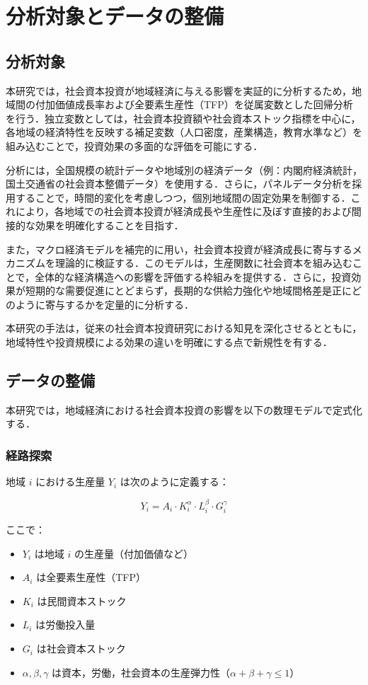 \chapter{分析対象とデータの整備}

\section{分析対象}
本研究では，社会資本投資が地域経済に与える影響を実証的に分析するため，地域間の付加価値成長率および全要素生産性（TFP）を従属変数とした回帰分析を行う．独立変数としては，社会資本投資額や社会資本ストック指標を中心に，各地域の経済特性を反映する補足変数（人口密度，産業構造，教育水準など）を組み込むことで，投資効果の多面的な評価を可能にする．

分析には，全国規模の統計データや地域別の経済データ（例：内閣府経済統計，国土交通省の社会資本整備データ）を使用する．さらに，パネルデータ分析を採用することで，時間的変化を考慮しつつ，個別地域間の固定効果を制御する．これにより，各地域での社会資本投資が経済成長や生産性に及ぼす直接的および間接的な効果を明確化することを目指す．

また，マクロ経済モデルを補完的に用い，社会資本投資が経済成長に寄与するメカニズムを理論的に検証する．このモデルは，生産関数に社会資本を組み込むことで，全体的な経済構造への影響を評価する枠組みを提供する．さらに，投資効果が短期的な需要促進にとどまらず，長期的な供給力強化や地域間格差是正にどのように寄与するかを定量的に分析する．

本研究の手法は，従来の社会資本投資研究における知見を深化させるとともに，地域特性や投資規模による効果の違いを明確にする点で新規性を有する．

\section{データの整備}

本研究では，地域経済における社会資本投資の影響を以下の数理モデルで定式化する．

\subsection{経路探索}

地域 \( i \) における生産量 \( Y_i \) は次のように定義する：

\[
	Y_i = A_i \cdot K_i^\alpha \cdot L_i^\beta \cdot G_i^\gamma
\]

ここで：
\begin{itemize}
	\renewcommand{\labelitemi}{}
	\item \( Y_i \) は地域 \( i \) の生産量（付加価値など）
	\item \( A_i \) は全要素生産性（TFP）
	\item \( K_i \) は民間資本ストック
	\item \( L_i \) は労働投入量
	\item \( G_i \) は社会資本ストック
	\item \( \alpha, \beta, \gamma \) は資本，労働，社会資本の生産弾力性（\( \alpha + \beta + \gamma \leq 1 \)）
\end{itemize}

